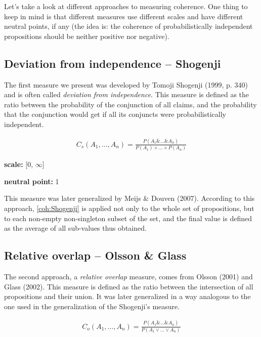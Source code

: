 \documentclass[10pt,]{scrartcl}
\begin{document}
Let's take a look at different approaches to measuring coherence. One
thing to keep in mind is that different measures use different scales
and have different neutral points, if any (the idea is: the coherence of
probabilistically independent propositions should be neither positive
nor negative).

\subsection{Deviation from independence -- Shogenji}

The first measure we present was developed by Tomoji Shogenji (1999, p.
340) and is often called \textit{deviation from independence}. This
measure is defined as the ratio between the probability of the
conjunction of all claims, and the probability that the conjunction
would get if all its conjuncts were probabilistically independent.

\begin{align}
    \tag{Shogenji}
    \label{coh:Shogenji}
    C_s(A_1,\dots,A_n)=\frac{P(A_1 \& \dots \& A_n)}{P(A_1)\times\dots\times P(A_n)}
\end{align}

\noindent \textbf{scale:} {[}0, \(\infty\){]}

\noindent  \textbf{neutral point:} 1

\noindent This measure was later generalized by Meijs \& Douven (2007).
According to this approach, \eqref{coh:Shogenji} is applied not only to
the whole set of propositions, but to each non-empty non-singleton
subset of the set, and the final value is defined as the average of all
sub-values thus obtained.

\subsection{Relative overlap -- Olsson \& Glass}

The second approach, a \textit{relative overlap} measure, comes from
Olsson (2001) and Glass (2002). This measure is defined as the ratio
between the intersection of all propositions and their union. It was
later generalized in a way analogous to the one used in the
generalization of the Shogenji's measure.

\begin{align}
    \tag{Olsson}
    \label{coh:Olsson}
    C_o(A_1,\dots,A_n)=\frac{P(A_1 \& \dots \& A_n)}{P(A_1 \vee \dots \vee A_n)}
\end{align}
\end{document}
